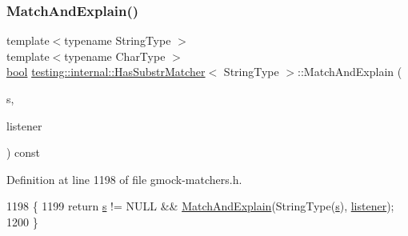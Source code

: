 \mbox{\label{classtesting_1_1internal_1_1HasSubstrMatcher_a68e0f4e2814c3c80c61011e66ad73839}} 
\subsubsection{\texorpdfstring{Match\+And\+Explain()}{MatchAndExplain()}\hspace{0.1cm}{\footnotesize\ttfamily [1/2]}}
{\footnotesize\ttfamily template$<$typename String\+Type $>$ \\
template$<$typename Char\+Type $>$ \\
\hyperlink{classbool}{bool} \hyperlink{classtesting_1_1internal_1_1HasSubstrMatcher}{testing\+::internal\+::\+Has\+Substr\+Matcher}$<$ String\+Type $>$\+::Match\+And\+Explain (\begin{DoxyParamCaption}\item[{Char\+Type $\ast$}]{s,  }\item[{\hyperlink{classtesting_1_1MatchResultListener}{Match\+Result\+Listener} $\ast$}]{listener }\end{DoxyParamCaption}) const\hspace{0.3cm}{\ttfamily [inline]}}



Definition at line 1198 of file gmock-\/matchers.\+h.


\begin{DoxyCode}
1198                                                                          \{
1199     \textcolor{keywordflow}{return} \hyperlink{namespaceservice__node__3_aa976421a49e0b54f23833423400849ae}{s} != NULL && \hyperlink{classtesting_1_1internal_1_1HasSubstrMatcher_a68e0f4e2814c3c80c61011e66ad73839}{MatchAndExplain}(StringType(\hyperlink{namespaceservice__node__3_aa976421a49e0b54f23833423400849ae}{s}), \hyperlink{namespaceinteractive__marker_a0e579ab555212bb5e2c9f8a675b7618a}{listener});
1200   \}
\end{DoxyCode}
\mbox{\label{classtesting_1_1internal_1_1HasSubstrMatcher_a11629040f168cefaaad4ecdbde17a0dc}} 
